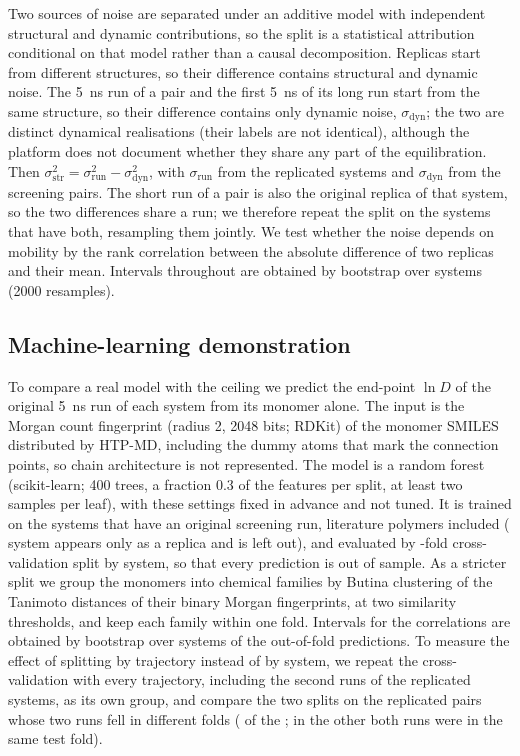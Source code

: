 \documentclass[journal=jcisd8,manuscript=article,email=true]{achemso}
\begin{document}
Two sources of noise are separated under an additive model with independent structural and
dynamic contributions, so the split is a statistical attribution conditional on that model rather
than a causal decomposition. Replicas start from different structures, so their difference
contains structural and dynamic noise. The \SI{5}{\nano\second} run of a pair and the
first \SI{5}{\nano\second} of its long run start from the same structure, so their difference
contains only dynamic noise, $\sigma_{\mathrm{dyn}}$; the two are distinct dynamical realisations
(their labels are not identical), although the platform does not document whether they share any
part of the equilibration. Then
$\sigma_{\mathrm{str}}^2=\sigma_{\mathrm{run}}^2-\sigma_{\mathrm{dyn}}^2$, with $\sigma_{\mathrm{run}}$ from the
\nRep{} replicated systems and $\sigma_{\mathrm{dyn}}$ from the \techoEndDynN{} screening pairs. The short
run of a pair is also the original replica of that system, so the two differences share a run; we
therefore repeat the split on the \techoEndJointN{} systems that have both, resampling them jointly. We test whether the noise
depends on mobility by the rank correlation between the absolute difference of two replicas and
their mean. Intervals throughout are obtained by bootstrap over systems (2000 resamples).

\subsection{Machine-learning demonstration}\label{sec:ml-method}
To compare a real model with the ceiling we predict the end-point $\ln D$ of the original
\SI{5}{\nano\second} run of each system from its monomer alone. The input is the Morgan count
fingerprint (radius 2, 2048 bits; RDKit) of the monomer SMILES distributed by HTP-MD, including
the dummy atoms that mark the connection points, so chain architecture is not represented. The
model is a random forest (scikit-learn; 400 trees, a fraction 0.3 of the features per split, at
least two samples per leaf), with these settings fixed in advance and not tuned. It is trained on
the \mlNSys{} systems that have an original screening run, literature polymers included
(\nOnlyReplica{} system appears only as a replica and is left out), and evaluated by
\mlFolds-fold cross-validation split by system, so that every prediction is out of sample. As a
stricter split we group the monomers into chemical families by Butina clustering of the Tanimoto
distances of their binary Morgan fingerprints, at two similarity thresholds, and keep each family
within one fold. Intervals for the correlations are obtained by bootstrap over systems of the
out-of-fold predictions. To measure the effect of splitting by trajectory instead of by system,
we repeat the cross-validation with every trajectory, including the second runs of the replicated
systems, as its own group, and compare the two splits on the replicated pairs whose two runs fell
in different folds (\mlLeakPairs{} of the \nRep{}; in the other \mlLeakSameFold{} both runs were
in the same test fold).
\end{document}
